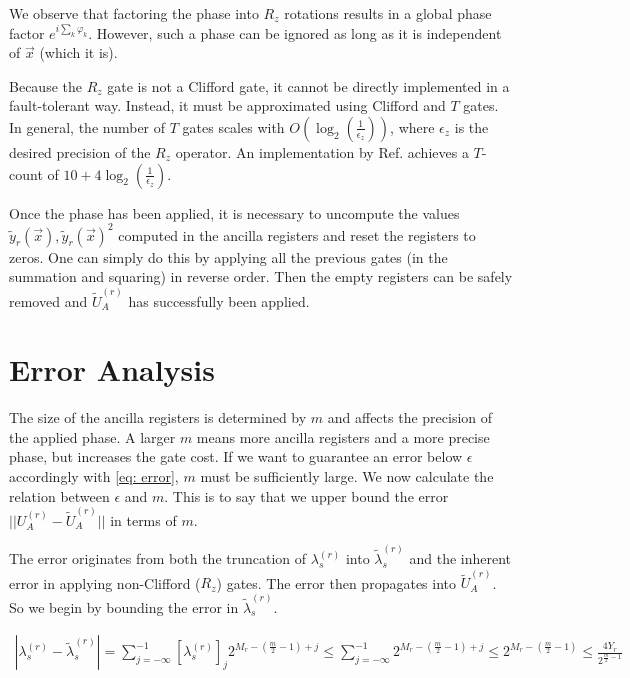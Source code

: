We observe that factoring the phase into $R_z$ rotations results in a global phase factor $e^{i\sum_k \varphi_k}$. However, such a phase can be ignored as long as it is independent of $\vec{x}$ (which it is).

Because the $R_z$ gate is not a Clifford gate, it cannot be directly implemented in a fault-tolerant way. Instead, it must be approximated using Clifford and $T$ gates. In general, the number of $T$ gates scales with $O(\log_2(\frac{1}{\epsilon_z}))$, where $\epsilon_z$ is the desired precision of the $R_z$ operator. An implementation by Ref. \cite{Rz} achieves a $T$-count of $10 + 4\log_2(\frac{1}{\epsilon_z})$. 

Once the phase has been applied, it is necessary to uncompute the values $\tilde{y}_r(\vec{x}), \tilde{y}_r(\vec{x})^2$ computed in the ancilla registers and reset the registers to zeros. One can simply do this by applying all the previous gates (in the summation and squaring) in reverse order. Then the empty registers can be safely removed and $\tilde{U}_A^{(r)}$ has successfully been applied.

\section{Error Analysis}

The size of the ancilla registers is determined by $m$ and affects the precision of the applied phase. A larger $m$ means more ancilla registers and a more precise phase, but increases the gate cost. If we want to guarantee an error below $\epsilon$ accordingly with \eqref{eq: error}, $m$ must be sufficiently large. We now calculate the relation between $\epsilon$ and $m$. This is to say that we upper bound the error $||U_A^{(r)} - \tilde{U}_A^{(r)}||$ in terms of $m$.

The error originates from both the truncation of $\lambda^{(r)}_s$ into $\tilde{\lambda}^{(r)}_s$ and the inherent error in applying non-Clifford ($R_z$) gates. The error then propagates into $\tilde{U}_A^{(r)}$. So we begin by bounding the error in $\tilde{\lambda}^{(r)}_s$.

\begin{equation}
    \begin{split}
        |\lambda^{(r)}_s - \tilde{\lambda}^{(r)}_s| = \sum_{j = -\infty}^{-1} [\lambda^{(r)}_s]_j2^{M_r - (\frac{m}{2} - 1) + j} \leq \sum_{j = -\infty}^{-1} 2^{M_r - (\frac{m}{2} - 1) + j} \leq 2^{M_r - (\frac{m}{2} - 1)} \leq \frac{4Y_r}{2^{\frac{m}{2} - 1}}
    \end{split}
\end{equation}

